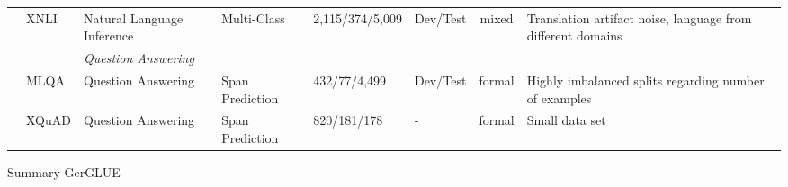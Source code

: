 \begin{landscape}
{\begin{tabularx}{\linewidth}{ll|lllllX}
                                                             & XNLI               & Natural Language Inference  & Multi-Class                 & 2,115/374/5,009                                       & Dev/Test                            & \multicolumn{1}{c}{mixed}                                    & Translation artifact noise, language from different domains  \\ \cline{3-8}
                                                             &                    & \multicolumn{6}{g}{\textit{Question Answering}}\\
                                                             & MLQA               & Question Answering          & Span Prediction             & 432/77/4,499                                          & Dev/Test                            & \multicolumn{1}{c}{formal}                                   & Highly imbalanced splits regarding number of examples        \\
                                                             & XQuAD              & Question Answering          & Span Prediction             & 820/181/178                                           & -                                   & \multicolumn{1}{c}{formal}                                   & Small data set
\end{tabularx}
}{Summary GerGLUE}

\end{landscape}

